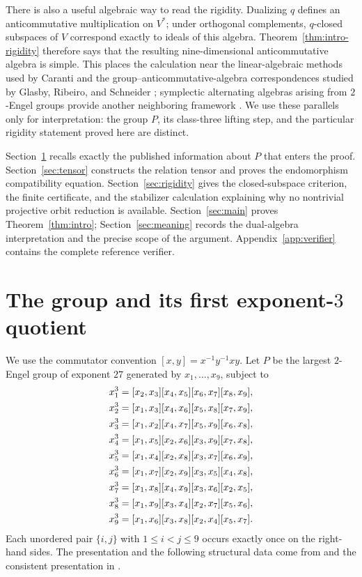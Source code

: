 \documentclass[11pt]{amsart}
\theoremstyle{definition}
\theoremstyle{remark}
\begin{document}
There is also a useful algebraic way to read the rigidity.  Dualizing $q$
defines an anticommutative multiplication on $V^*$; under orthogonal
complements, $q$-closed subspaces of $V$ correspond exactly to ideals of
this algebra.  Theorem~\ref{thm:intro-rigidity} therefore says that the
resulting nine-dimensional anticommutative algebra is simple.  This
places the calculation near the linear-algebraic methods used by Caranti
\cite[Section~3]{Caranti15} and the group--anticommutative-algebra
correspondences studied by Glasby, Ribeiro, and Schneider
\cite{GlasbyRibeiroSchneider20}; symplectic alternating algebras arising
from $2$-Engel groups provide another neighboring framework
\cite{Traustason08}.  We use these parallels only for interpretation: the
group $P$, its class-three lifting step, and the particular rigidity
statement proved here are distinct.

Section~\ref{sec:group} recalls exactly the published information about
$P$ that enters the proof.  Section~\ref{sec:tensor} constructs the
relation tensor and proves the endomorphism compatibility equation.
Section~\ref{sec:rigidity} gives the closed-subspace criterion, the
finite certificate, and the stabilizer calculation explaining why no
nontrivial projective orbit reduction is available.  Section~\ref{sec:main}
proves Theorem~\ref{thm:intro}; Section~\ref{sec:meaning} records the
dual-algebra interpretation and the precise scope of the argument.
Appendix~\ref{app:verifier} contains the complete reference verifier.

\section{The group and its first exponent-\texorpdfstring{$3$}{3} quotient}\label{sec:group}

We use the commutator convention $[x,y]=x^{-1}y^{-1}xy$.  Let $P$ be the
largest $2$-Engel group of exponent $27$ generated by
$x_1,\ldots,x_9$, subject to
\begin{align}
 x_1^3&=[x_2,x_3][x_4,x_5][x_6,x_7][x_8,x_9],\notag\\
 x_2^3&=[x_1,x_3][x_4,x_6][x_5,x_8][x_7,x_9],\notag\\
 x_3^3&=[x_1,x_2][x_4,x_7][x_5,x_9][x_6,x_8],\notag\\
 x_4^3&=[x_1,x_5][x_2,x_6][x_3,x_9][x_7,x_8],\notag\\
 x_5^3&=[x_1,x_4][x_2,x_8][x_3,x_7][x_6,x_9],\label{eq:relations}\\
 x_6^3&=[x_1,x_7][x_2,x_9][x_3,x_5][x_4,x_8],\notag\\
 x_7^3&=[x_1,x_8][x_4,x_9][x_3,x_6][x_2,x_5],\notag\\
 x_8^3&=[x_1,x_9][x_3,x_4][x_2,x_7][x_5,x_6],\notag\\
 x_9^3&=[x_1,x_6][x_3,x_8][x_2,x_4][x_5,x_7].\notag
\end{align}
Each unordered pair $\{i,j\}$ with $1\le i<j\le9$ occurs exactly once on
the right-hand sides.  The presentation and the following structural data
come from \cite[Remark~2.1]{AFH08three} and the consistent presentation in
\cite[p.~2]{AFLObrien10}.
\end{document}

